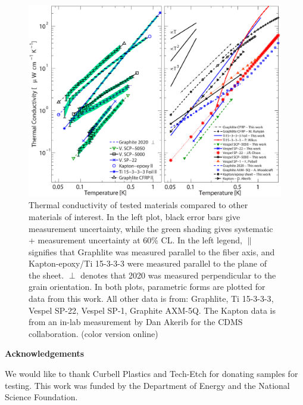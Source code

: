 \documentclass[final]{svjour2}
\begin{document}
\begin{figure}[h]
\includegraphics[width = .984\textwidth,trim = 0 0 0 1.25cm]{K_plots_3.eps}
\caption{{\small Thermal conductivity of tested materials compared to other materials of interest. In the left plot, black error bars give measurement uncertainty, while the green shading gives systematic + measurement uncertainty at 60\% CL. In the left legend, $\parallel$ signifies that Graphlite was measured parallel to the fiber axis, and Kapton-epoxy/Ti 15-3-3-3 were measured parallel to the plane of the sheet. $\perp$ denotes that 2020 was measured perpendicular to the grain orientation. In both plots, parametric forms are plotted for data from this work. All other data is from: Graphlite\cite{Runyan2008}, Ti 15-3-3-3\cite{Wikus2010}, Vespel SP-22\cite{Olson1993}, Vespel SP-1\cite{Pobell1992}, Graphite AXM-5Q\cite{Woodcraft2009}. The Kapton data is from an in-lab measurement by Dan Akerib for the CDMS collaboration. (color version online)}}
\label{plots}
\end{figure}

\noindent \textbf{Acknowledgements}

\noindent We would like to thank Curbell Plastics and Tech-Etch for donating samples for testing. This work was funded by the Department of Energy and the National Science Foundation.


\vspace{-0.41cm}
\end{document}
